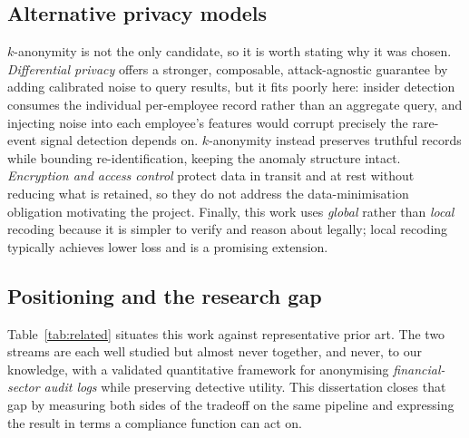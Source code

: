 \documentclass[10pt,a4paper]{article}
\begin{document}
\subsection{Alternative privacy models}
$k$-anonymity is not the only candidate, so it is worth stating why it was chosen. \emph{Differential privacy} \cite{dwork2014} offers a stronger, composable, attack-agnostic guarantee by adding calibrated noise to query results, but it fits poorly here: insider detection consumes the individual per-employee record rather than an aggregate query, and injecting noise into each employee's features would corrupt precisely the rare-event signal detection depends on. $k$-anonymity instead preserves truthful records while bounding re-identification, keeping the anomaly structure intact. \emph{Encryption and access control} protect data in transit and at rest without reducing what is retained, so they do not address the data-minimisation obligation motivating the project. Finally, this work uses \emph{global} rather than \emph{local} recoding because it is simpler to verify and reason about legally; local recoding \cite{xu2006} typically achieves lower loss and is a promising extension.

\subsection{Positioning and the research gap}
Table~\ref{tab:related} situates this work against representative prior art. The two streams are each well studied but almost never together, and never, to our knowledge, with a validated quantitative framework for anonymising \emph{financial-sector audit logs} while preserving detective utility. This dissertation closes that gap by measuring both sides of the tradeoff on the same pipeline and expressing the result in terms a compliance function can act on.
\end{document}
